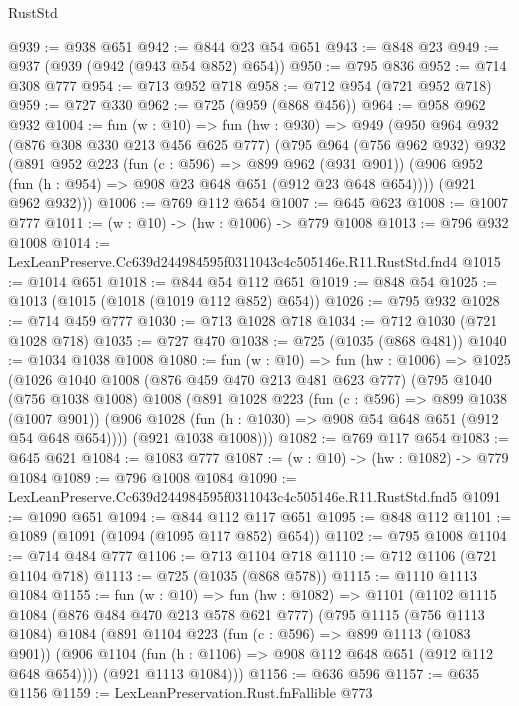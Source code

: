 \begin{lexlean}{RustStd}
\begin{coremodule}
@939 := @938 @651
@942 := @844 @23 @54 @651
@943 := @848 @23
@949 := @937 (@939 (@942 (@943 @54 @852) @654))
@950 := @795 @836
@952 := @714 @308 @777
@954 := @713 @952 @718
@958 := @712 @954 (@721 @952 @718)
@959 := @727 @330
@962 := @725 (@959 (@868 @456))
@964 := @958 @962 @932
@1004 := fun (w : @10) =>
  fun (hw : @930) =>
  @949
    (@950
      @964
      @932
      (@876 @308 @330 @213 @456 @625 @777)
      (@795
        @964
        (@756 @962 @932)
        @932
        (@891
          @952
          @223
          (fun (c : @596) => @899 @962 (@931 @901))
          (@906 @952 (fun (h : @954) => @908 @23 @648 @651 (@912 @23 @648 @654))))
        (@921 @962 @932)))
@1006 := @769 @112 @654
@1007 := @645 @623
@1008 := @1007 @777
@1011 := (w : @10) -> (hw : @1006) -> @779 @1008
@1013 := @796 @932 @1008
@1014 := LexLeanPreserve.Cc639d244984595f0311043c4c505146e.R11.RustStd.fnd4
@1015 := @1014 @651
@1018 := @844 @54 @112 @651
@1019 := @848 @54
@1025 := @1013 (@1015 (@1018 (@1019 @112 @852) @654))
@1026 := @795 @932
@1028 := @714 @459 @777
@1030 := @713 @1028 @718
@1034 := @712 @1030 (@721 @1028 @718)
@1035 := @727 @470
@1038 := @725 (@1035 (@868 @481))
@1040 := @1034 @1038 @1008
@1080 := fun (w : @10) =>
  fun (hw : @1006) =>
  @1025
    (@1026
      @1040
      @1008
      (@876 @459 @470 @213 @481 @623 @777)
      (@795
        @1040
        (@756 @1038 @1008)
        @1008
        (@891
          @1028
          @223
          (fun (c : @596) => @899 @1038 (@1007 @901))
          (@906 @1028 (fun (h : @1030) => @908 @54 @648 @651 (@912 @54 @648 @654))))
        (@921 @1038 @1008)))
@1082 := @769 @117 @654
@1083 := @645 @621
@1084 := @1083 @777
@1087 := (w : @10) -> (hw : @1082) -> @779 @1084
@1089 := @796 @1008 @1084
@1090 := LexLeanPreserve.Cc639d244984595f0311043c4c505146e.R11.RustStd.fnd5
@1091 := @1090 @651
@1094 := @844 @112 @117 @651
@1095 := @848 @112
@1101 := @1089 (@1091 (@1094 (@1095 @117 @852) @654))
@1102 := @795 @1008
@1104 := @714 @484 @777
@1106 := @713 @1104 @718
@1110 := @712 @1106 (@721 @1104 @718)
@1113 := @725 (@1035 (@868 @578))
@1115 := @1110 @1113 @1084
@1155 := fun (w : @10) =>
  fun (hw : @1082) =>
  @1101
    (@1102
      @1115
      @1084
      (@876 @484 @470 @213 @578 @621 @777)
      (@795
        @1115
        (@756 @1113 @1084)
        @1084
        (@891
          @1104
          @223
          (fun (c : @596) => @899 @1113 (@1083 @901))
          (@906 @1104 (fun (h : @1106) => @908 @112 @648 @651 (@912 @112 @648 @654))))
        (@921 @1113 @1084)))
@1156 := @636 @596
@1157 := @635 @1156
@1159 := LexLeanPreservation.Rust.fnFallible @773

\end{coremodule}
\end{lexlean}
